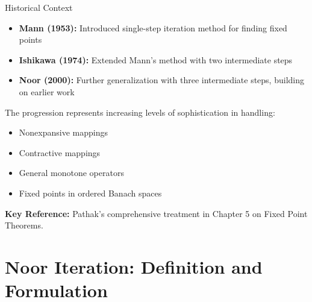 \documentclass[aspectratio=169,10pt]{beamer}
\begin{document}
\begin{frame}{Historical Context}

\begin{itemize}
  \item \textbf{Mann (1953):} Introduced single-step iteration method for finding fixed points
  \item \textbf{Ishikawa (1974):} Extended Mann's method with two intermediate steps
  \item \textbf{Noor (2000):} Further generalization with three intermediate steps, building on earlier work
\end{itemize}

\vspace{0.5cm}

The progression represents increasing levels of sophistication in handling:
\begin{itemize}
  \item Nonexpansive mappings
  \item Contractive mappings
  \item General monotone operators
  \item Fixed points in ordered Banach spaces
\end{itemize}

\vspace{0.5cm}

\textbf{Key Reference:} Pathak's comprehensive treatment in Chapter 5 on Fixed Point Theorems.

\end{frame}


\section{Noor Iteration: Definition and Formulation}
\end{document}
